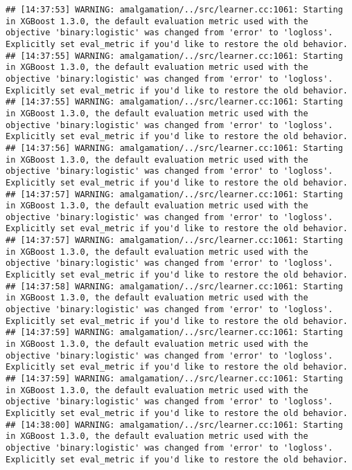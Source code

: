 \documentclass[
]{book}
\begin{document}
\begin{verbatim}
## [14:37:53] WARNING: amalgamation/../src/learner.cc:1061: Starting in XGBoost 1.3.0, the default evaluation metric used with the objective 'binary:logistic' was changed from 'error' to 'logloss'. Explicitly set eval_metric if you'd like to restore the old behavior.
## [14:37:55] WARNING: amalgamation/../src/learner.cc:1061: Starting in XGBoost 1.3.0, the default evaluation metric used with the objective 'binary:logistic' was changed from 'error' to 'logloss'. Explicitly set eval_metric if you'd like to restore the old behavior.
## [14:37:55] WARNING: amalgamation/../src/learner.cc:1061: Starting in XGBoost 1.3.0, the default evaluation metric used with the objective 'binary:logistic' was changed from 'error' to 'logloss'. Explicitly set eval_metric if you'd like to restore the old behavior.
## [14:37:56] WARNING: amalgamation/../src/learner.cc:1061: Starting in XGBoost 1.3.0, the default evaluation metric used with the objective 'binary:logistic' was changed from 'error' to 'logloss'. Explicitly set eval_metric if you'd like to restore the old behavior.
## [14:37:57] WARNING: amalgamation/../src/learner.cc:1061: Starting in XGBoost 1.3.0, the default evaluation metric used with the objective 'binary:logistic' was changed from 'error' to 'logloss'. Explicitly set eval_metric if you'd like to restore the old behavior.
## [14:37:57] WARNING: amalgamation/../src/learner.cc:1061: Starting in XGBoost 1.3.0, the default evaluation metric used with the objective 'binary:logistic' was changed from 'error' to 'logloss'. Explicitly set eval_metric if you'd like to restore the old behavior.
## [14:37:58] WARNING: amalgamation/../src/learner.cc:1061: Starting in XGBoost 1.3.0, the default evaluation metric used with the objective 'binary:logistic' was changed from 'error' to 'logloss'. Explicitly set eval_metric if you'd like to restore the old behavior.
## [14:37:59] WARNING: amalgamation/../src/learner.cc:1061: Starting in XGBoost 1.3.0, the default evaluation metric used with the objective 'binary:logistic' was changed from 'error' to 'logloss'. Explicitly set eval_metric if you'd like to restore the old behavior.
## [14:37:59] WARNING: amalgamation/../src/learner.cc:1061: Starting in XGBoost 1.3.0, the default evaluation metric used with the objective 'binary:logistic' was changed from 'error' to 'logloss'. Explicitly set eval_metric if you'd like to restore the old behavior.
## [14:38:00] WARNING: amalgamation/../src/learner.cc:1061: Starting in XGBoost 1.3.0, the default evaluation metric used with the objective 'binary:logistic' was changed from 'error' to 'logloss'. Explicitly set eval_metric if you'd like to restore the old behavior.

\end{verbatim}
\end{document}
